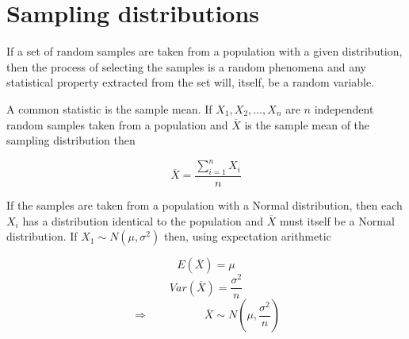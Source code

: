 \documentclass[a5paper]{article}
\begin{document}
\section{Sampling distributions}

If a set of random samples are taken from a population with a given
distribution, then the process of selecting the samples is a random phenomena
and any statistical property extracted from the set will, itself, be a random
variable.

A common statistic is the sample mean. If $X_1, X_2, \ldots, X_n$ are $n$
independent random samples taken from a population and $\overline{X}$ is the
sample mean of the sampling distribution then

\begin{equation}
  \overline{X} = \frac{\sum_{i=1}^{n}X_i}{n}
\end{equation}

If the samples are taken from a population with a Normal distribution, then each
$X_i$ has a distribution identical to the population and $\overline{X}$ must
itself be a Normal distribution. If $X_1\sim N(\mu,\sigma^2)$ then, using
expectation arithmetic

\begin{equation}
  E(\overline{X}) = \mu
\end{equation}
\begin{equation}
  Var(\overline{X}) = \frac{\sigma^2}{n}
\end{equation}
\begin{equation}
  \Rightarrow \hspace{5em} \overline{X}\sim N\left(\mu, \frac{\sigma^2}{n}\right)
\end{equation}
\end{document}
